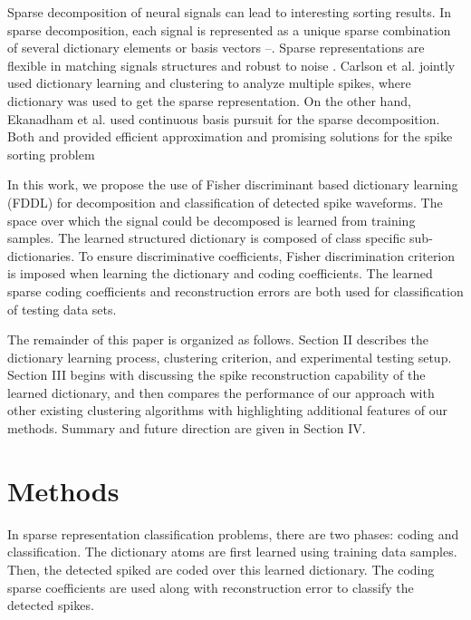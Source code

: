 \documentclass[conference]{IEEEtran}
\begin{document}
	Sparse decomposition of neural signals can lead to interesting sorting results. In sparse decomposition, each signal is represented as a unique sparse combination of several dictionary elements or basis vectors \cite{carlson2013multichannel}–\cite{lewicki2000learning}. Sparse representations are flexible in matching signals structures and robust to noise \cite{lewicki2000learning}. Carlson et al. \cite{carlson2013multichannel} jointly used dictionary learning and clustering to analyze multiple spikes, where dictionary was used to get the sparse representation. On the other hand, Ekanadham et al. \cite{ekanadham2014unified} used continuous basis pursuit for the sparse decomposition. Both \cite{carlson2013multichannel} and \cite{ekanadham2014unified} provided efficient approximation and promising solutions for the spike sorting problem
	
	In this work, we propose the use of Fisher discriminant based dictionary learning (FDDL) \cite{yang2011fisher} for decomposition and classification of detected spike waveforms. The space over which the signal could be decomposed is learned from training samples. The learned structured dictionary is composed of class specific sub-dictionaries. To ensure discriminative coefficients, Fisher discrimination criterion is imposed when learning the dictionary and coding coefficients. The learned sparse coding coefficients and reconstruction errors are both used for classification of testing data sets.
	
	The remainder of this paper is organized as follows. Section II describes the dictionary learning process, clustering criterion, and experimental testing setup. Section III begins with discussing the spike reconstruction capability of the learned dictionary, and then compares the performance of our approach with other existing clustering algorithms with highlighting additional features of our methods. Summary and future direction are given in Section IV.
	
	\section{Methods}
	In sparse representation classification problems, there are two phases: coding and classification. The dictionary atoms are first learned using training data samples. Then, the detected spiked are coded over this learned dictionary. The coding sparse coefficients are used along with reconstruction error to classify the detected spikes.
	
\end{document}
